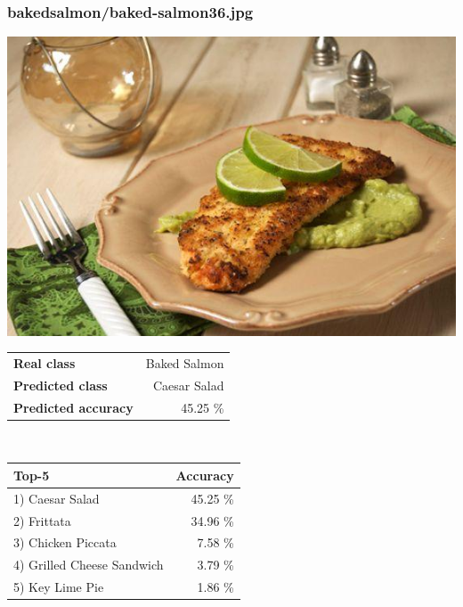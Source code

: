 \subsubsection{baked\textunderscore salmon/baked-salmon36.jpg}

\begin{minipage}[t]{0.4\textwidth}
	\vspace{0pt}
	\includegraphics[width=\linewidth]{images/evaluation-images/baked_salmon/baked-salmon36.jpg}
\end{minipage}
\hfill
\begin{minipage}[t]{0.5\textwidth}
	\vspace{0pt}\raggedright
	\begin{tabularx}{\textwidth}{X r}
		\small \textbf{Real class} & \small Baked Salmon\\
		\small \textbf{Predicted class} & \small Caesar Salad\\
		\small \textbf{Predicted accuracy} & \small 45.25 \%
    \end{tabularx}\\
    
    \vspace{6pt}
	\begin{tabularx}{\textwidth}{X r}
        \small \textbf{Top-5} & \small \textbf{Accuracy} \\
        \hline
		\small 1) Caesar Salad & \small 45.25 \%\\\small 2) Frittata & \small 34.96 \%\\\small 3) Chicken Piccata & \small 7.58 \%\\\small 4) Grilled Cheese Sandwich & \small 3.79 \%\\\small 5) Key Lime Pie & \small 1.86 \%
    \end{tabularx}
\end{minipage}
    
